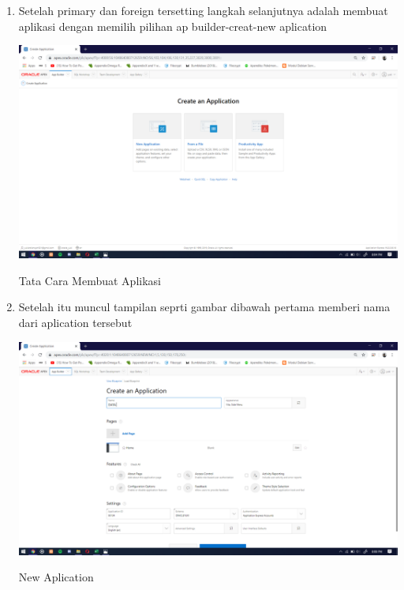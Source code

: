 \documentclass{article}
\begin{document}
\begin{enumerate}
      \item Setelah primary dan foreign tersetting langkah selanjutnya adalah membuat aplikasi dengan memilih pilihan ap builder-creat-new aplication
    \begin{center}
         \centering
            \includegraphics[scale=0.27]{figures/DB8.png}
        \caption{Tata Cara Membuat Aplikasi}
        \label{excel}
    \end{center}
    
     \item Setelah itu muncul tampilan seprti gambar dibawah pertama memberi nama dari aplication tersebut
    \begin{center}
         \centering
            \includegraphics[scale=0.27]{figures/DB9.png}
        \caption{New Aplication}
        \label{excel}
    \end{center}
    

\end{enumerate}
\end{document}
